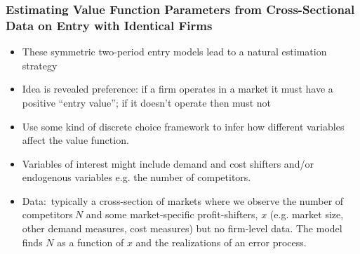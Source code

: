 \begin{frame}%

\frametitle{Estimating Value
Function Parameters from Cross-Sectional Data on
 Entry with Identical Firms}

\begin{itemize}
\item These symmetric two-period entry models lead to a natural estimation
strategy

\item Idea is revealed preference: if a firm operates in a market it must
have a positive \textquotedblleft entry value\textquotedblright ; if it
doesn't operate then must not

\item Use some kind of discrete choice framework to infer how different
variables affect the value function.

\item Variables of interest might include demand and cost shifters and/or
endogenous variables e.g. the number of competitors.

\item Data:\ typically a cross-section of markets where we observe the
number of competitors$\ N$ and some market-specific profit-shifters, $x$
(e.g. market size, other demand measures, cost measures) but no firm-level
data. The model finds $N$ as a function of $x$ and the realizations of an
error process.
\end{itemize}

\end{frame}%

